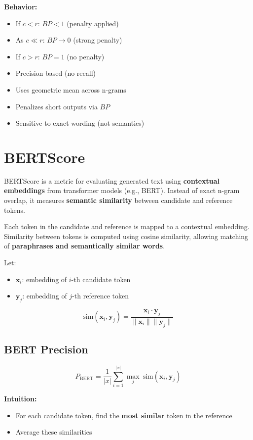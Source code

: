 \documentclass[10pt,a4paper]{article}
\begin{document}
\textbf{Behavior:}
\begin{itemize}
    \item If $c < r$: $BP < 1$ (penalty applied)
    \item As $c \ll r$: $BP \to 0$ (strong penalty)
    \item If $c > r$: $BP = 1$ (no penalty)
    \item Precision-based (no recall)
    \item Uses geometric mean across n-grams
    \item Penalizes short outputs via $BP$
    \item Sensitive to exact wording (not semantics)
\end{itemize}

\section{BERTScore}

BERTScore is a metric for evaluating generated text using \textbf{contextual embeddings} from transformer models (e.g., BERT). Instead of exact n-gram overlap, it measures \textbf{semantic similarity} between candidate and reference tokens.

Each token in the candidate and reference is mapped to a contextual embedding. Similarity between tokens is computed using cosine similarity, allowing matching of \textbf{paraphrases and semantically similar words}.


Let:
\begin{itemize}
    \item $\mathbf{x}_i$: embedding of $i$-th candidate token
    \item $\mathbf{y}_j$: embedding of $j$-th reference token
\end{itemize}

\[
\text{sim}(\mathbf{x}_i, \mathbf{y}_j) = \frac{\mathbf{x}_i \cdot \mathbf{y}_j}{\|\mathbf{x}_i\| \|\mathbf{y}_j\|}
\]

\subsection{BERT Precision}

\[
P_{\text{BERT}} =
\frac{1}{|x|} \sum_{i=1}^{|x|} \max_{j} \ \text{sim}(\mathbf{x}_i, \mathbf{y}_j)
\]

\textbf{Intuition:}
\begin{itemize}
    \item For each candidate token, find the \textbf{most similar} token in the reference
    \item Average these similarities
\end{itemize}
\end{document}
